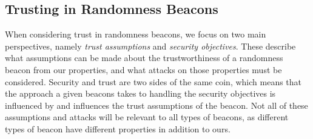\subsection{Trusting in Randomness Beacons}
When considering trust in randomness beacons, we focus on two main perspectives, namely \emph{trust assumptions} and \emph{security objectives}.
These describe what assumptions can be made about the trustworthiness of a randomness beacon from our properties, and what attacks on those properties must be considered.
Security and trust are two sides of the same coin, which means that the approach a given beacons takes to handling the security objectives is influenced by and influences the trust assumptions of the beacon. Not all of these assumptions and attacks will be relevant to all types of beacons, as different types of beacon have different properties in addition to ours.


